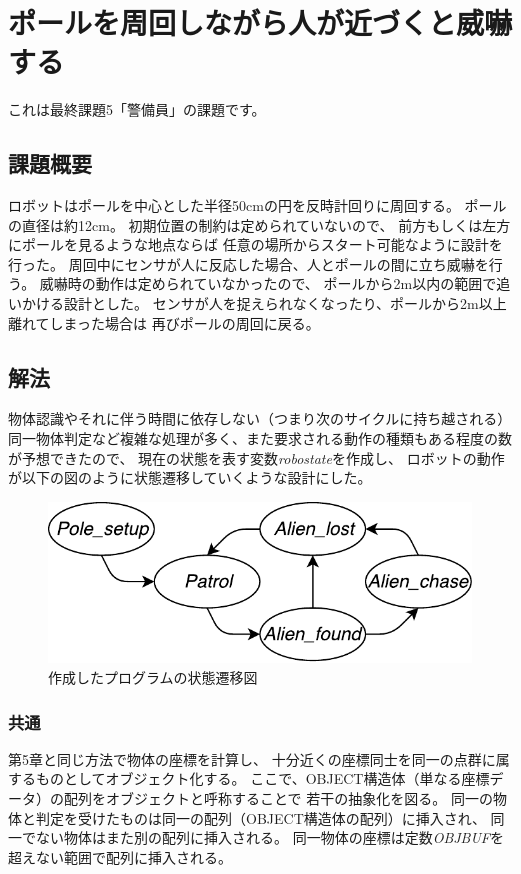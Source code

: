 \documentclass[main]{subfiles}
\begin{document}
\chapter{ポールを周回しながら人が近づくと威嚇する}

これは最終課題5「警備員」の課題です。

\section{課題概要}
ロボットはポールを中心とした半径50cmの円を反時計回りに周回する。
ポールの直径は約12cm。
初期位置の制約は定められていないので、
前方もしくは左方にポールを見るような地点ならば
任意の場所からスタート可能なように設計を行った。
周回中にセンサが人に反応した場合、人とポールの間に立ち威嚇を行う。
威嚇時の動作は定められていなかったので、
ポールから2m以内の範囲で追いかける設計とした。
センサが人を捉えられなくなったり、ポールから2m以上離れてしまった場合は
再びポールの周回に戻る。

\section{解法}
物体認識やそれに伴う時間に依存しない（つまり次のサイクルに持ち越される）
同一物体判定など複雑な処理が多く、また要求される動作の種類もある程度の数が予想できたので、
現在の状態を表す変数\textit{robostate}を作成し、
ロボットの動作が以下の図のように状態遷移していくような設計にした。
\begin{figure}[H]
	\centering
	\includegraphics{img/guard_state.pdf}
	\caption{作成したプログラムの状態遷移図}
\end{figure}

\subsection{共通}
第5章と同じ方法で物体の座標を計算し、
十分近くの座標同士を同一の点群に属するものとしてオブジェクト化する。
ここで、OBJECT構造体（単なる座標データ）の配列をオブジェクトと呼称することで
若干の抽象化を図る。
同一の物体と判定を受けたものは同一の配列（OBJECT構造体の配列）に挿入され、
同一でない物体はまた別の配列に挿入される。
同一物体の座標は定数\textit{OBJBUF}を超えない範囲で配列に挿入される。
\end{document}
